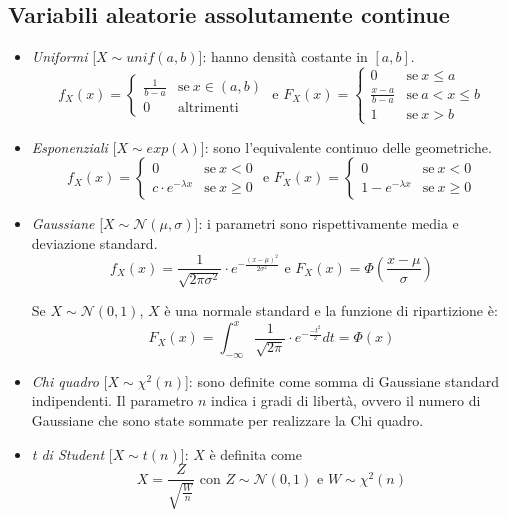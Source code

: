 \documentclass[12pt, a4paper]{report}
\theoremstyle{definition}
\begin{document}
\subsection{Variabili aleatorie assolutamente continue}
\begin{itemize}
    \item \emph{Uniformi} [$X\sim unif(a,b)$]: hanno densità costante in $[a,b]$.
    \[f_X(x)=\begin{cases}
		{\frac{1}{b-a}} & \text{se}\ x\in(a,b)\\
		{0} & \text{altrimenti}
	\end{cases}\text{ e }F_X(x)=\begin{cases}
		{0} & \text{se}\ {x\leq a}\\
		{\frac{x-a}{b-a}} & \text{se}\ {a<x\leq b}\\
		{1} & \text{se}\ {x>b}
	\end{cases}\]

    \item \emph{Esponenziali} [$X\sim exp(\lambda)$]: sono l'equivalente continuo
    delle geometriche.
    \[f_X(x)=\begin{cases}
        {0} & \text{se}\ {x<0}\\
		{c\cdot e^{-\lambda x}} & \text{se}\ {x\geq 0}
	\end{cases}\text{ e }F_X(x)=\begin{cases}
        {0} & \text{se}\ {x<0}\\
        {1-e^{-\lambda x}} & \text{se}\ {x\geq 0}
    \end{cases}\]
    
    \item \emph{Gaussiane} [$X\sim\mathcal{N}(\mu, \sigma)$]: i parametri sono
    rispettivamente media e deviazione standard.
    \[f_X(x)=\frac{1}{\sqrt{2\pi\sigma^2}}\cdot e^{-\frac{(x-\mu)^2}{2\sigma^2}}
    \text{ e }F_X(x)=\Phi\left(\frac{x-\mu}{\sigma}\right)\]

    Se $X\sim\mathcal{N}(0,1)$, $X$ è una normale standard e la funzione di
    ripartizione è:
    \[F_X(x)=\int_{-\infty}^x \frac{1}{\sqrt{2\pi}}\cdot e^{-\frac{-t^2}{2}}dt
    =\Phi(x)\]


    \item \emph{Chi quadro} [$X\sim\chi^2(n)$]: sono definite come somma di
    Gaussiane standard indipendenti. Il parametro $n$ indica i gradi di libertà,
    ovvero il numero di Gaussiane che sono state sommate per realizzare la Chi quadro.

    \item \emph{t di Student} [$X\sim t(n)$]: $X$ è definita come
    \[X=\frac{Z}{\sqrt{\frac{W}{n}}}\text{ con }Z\sim\mathcal{N}(0,1)\text{ e }
    W\sim\chi^2(n)\]
\end{itemize}
\end{document}
